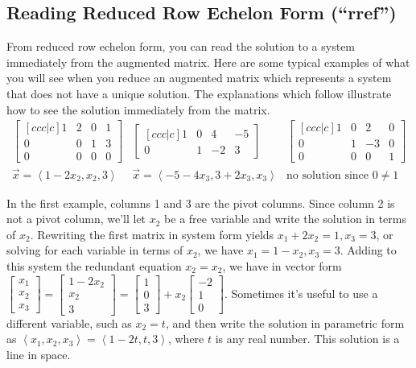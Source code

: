 \subsection{Reading Reduced Row Echelon Form (``rref'')}

From reduced row echelon form, you can read the solution to a system immediately from the augmented matrix.  Here are some typical examples of what you will see when you reduce an augmented matrix which represents a system that does not have a unique solution. The explanations which follow illustrate how to see the solution immediately from the matrix.
$$\begin{array}{ccc}
 \begin{bmatrix}[ccc|c] 1&2&0&1\\0&0&1&3
\\0&0&0&0\end{bmatrix} 
& \begin{bmatrix}[ccc|c] 1&0&4&-5\\0&1&-2&3
\end{bmatrix} 
& \begin{bmatrix}[ccc|c] 1&0&2&0\\0&1&-3&0
\\0&0&0&1\end{bmatrix} 
\\
\vec x = \left<1-2x_2,x_2,3\right>
&\vec x = \left<-5-4x_3,3+2x_3,x_3\right>
&\text{no solution since } 0\neq1
\end{array}
$$

\begin{example}
In the first example, columns 1 and 3 are the pivot columns. Since column 2 is not a pivot column, we'll let $x_2$ be a free variable and write the solution in terms of $x_2$. Rewriting the first matrix in system form yields $x_1+2x_2 =1,x_3=3$, or solving for each variable in terms of $x_2$, we have $x_1=1-x_2,x_3=3$.  
Adding to this system the redundant equation $x_2=x_2$, we have in vector form 
$\begin{bmatrix}x_1\\x_2\\x_3\end{bmatrix} = \begin{bmatrix}1-2x_2\\x_2\\3\end{bmatrix} = \begin{bmatrix}1\\0\\3\end{bmatrix} + x_2 \begin{bmatrix}-2\\1\\0\end{bmatrix}$. 
Sometimes it's useful to use a different variable, such as $x_2=t$, and then write the solution in parametric form as $\left<x_1,x_2,x_3\right>=\left<1-2t,t,3\right>$, where $t$ is any real number. This solution is a line in space. 
\end{example}

